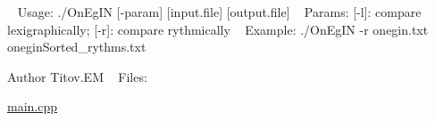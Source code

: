 ~\newline
Usage\+: ./\+On\+Eg\+IN \mbox{[}-\/param\mbox{]} \mbox{[}input.\+file\mbox{]} \mbox{[}output.\+file\mbox{]} ~\newline
Params\+: \mbox{[}-\/l\mbox{]}\+: compare lexigraphically; \mbox{[}-\/r\mbox{]}\+: compare rythmically ~\newline
Example\+: ./\+On\+Eg\+IN -\/r onegin.\+txt onegin\+Sorted\+\_\+rythms.\+txt ~\newline
\begin{DoxyAuthor}{Author}
Titov.\+EM ~\newline
Files\+: ~\newline

\begin{DoxyItemize}
\item \hyperlink{main_8cpp}{main.\+cpp} ~\newline
 
\end{DoxyItemize}
\end{DoxyAuthor}
